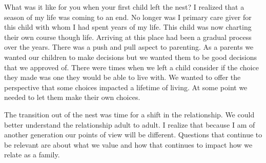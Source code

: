 What was it like for you when your first child left the nest?
I realized that a season of my life was coming to an end.
No longer was I primary care giver for this child with whom I had spent years of my life.
This child was now charting their own course though life.
Arriving at this place had been a gradual process over the years.
There was a push and pull aspect to parenting.
As a parents we wanted our children to make decisions but we wanted them to be good decisions that we approved of.
There were times when we left a child consider if the choice they made was one they would be able to live with.
We wanted to offer the perspective that some choices impacted a lifetime of living.
At some point we needed to let them make their own choices.

The transition out of the nest was time for a shift in the relationship.
We could better understand the relationship adult to adult.
I realize that because I am of another generation our points of view will be different.
Questions that continue to be relevant are about what we value and how that continues to impact how we relate as a family.







